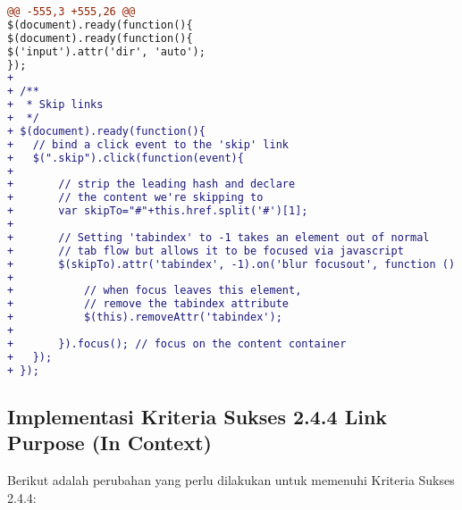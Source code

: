 \begin{lstlisting}[language=diff, caption=Perubahan pada \textit{file} \textit{shj\_functions.js}, label=lst_2.4.1:3, basicstyle=\ttfamily, frame=single,
columns=fullflexible, keepspaces=true, breaklines=true]
@@ -555,3 +555,26 @@ 
$(document).ready(function(){
$(document).ready(function(){
$('input').attr('dir', 'auto');
});
+ 
+ /**
+  * Skip links
+  */
+ $(document).ready(function(){
+ 	// bind a click event to the 'skip' link
+ 	$(".skip").click(function(event){
+     
+ 		// strip the leading hash and declare
+ 		// the content we're skipping to
+ 		var skipTo="#"+this.href.split('#')[1];
+ 
+ 		// Setting 'tabindex' to -1 takes an element out of normal 
+ 		// tab flow but allows it to be focused via javascript
+ 		$(skipTo).attr('tabindex', -1).on('blur focusout', function () {
+ 
+ 			// when focus leaves this element, 
+ 			// remove the tabindex attribute
+ 			$(this).removeAttr('tabindex');
+ 
+ 		}).focus(); // focus on the content container
+ 	});
+ });
\end{lstlisting}

\subsection{Implementasi Kriteria Sukses 2.4.4 Link Purpose (In Context)}
\label{subsec:implementasi_A_2.4.4}

Berikut adalah perubahan yang perlu dilakukan untuk memenuhi Kriteria Sukses 2.4.4:

